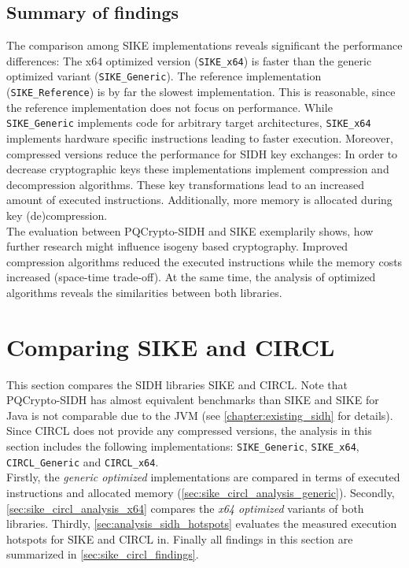 \subsection{Summary of findings}\label{sec:findings_sike}
The comparison among \gls{SIKE} implementations reveals significant the performance differences: The x64 optimized version (\texttt{SIKE\_x64}) is faster than the generic optimized variant (\texttt{SIKE\_Generic}). The reference implementation (\texttt{SIKE\_Reference}) is by far the slowest implementation. This is reasonable, since the reference implementation does not focus on performance. While \texttt{SIKE\_Generic} implements code for arbitrary target architectures, \texttt{SIKE\_x64} implements hardware specific instructions leading to faster execution.  Moreover, compressed versions reduce the performance for \gls{SIDH} key exchanges: In order to decrease cryptographic keys these implementations implement compression and decompression algorithms. These key transformations lead to an increased amount of executed instructions. Additionally, more memory is allocated during key (de)compression.\\
The evaluation between \gls{PQCrypto-SIDH} and \gls{SIKE} exemplarily shows, how further research might influence isogeny based cryptography. Improved compression algorithms reduced the executed instructions while the memory costs increased (space-time trade-off). At the same time, the analysis of optimized algorithms reveals the similarities between both libraries.

\newpage
\section{Comparing \gls{SIKE} and \gls{CIRCL}} \label{sec:sike_vs_circl}

This section compares the SIDH libraries \gls{SIKE} and \gls{CIRCL}. Note that \gls{PQCrypto-SIDH} has almost equivalent benchmarks than \gls{SIKE} and SIKE for Java is not comparable due to the JVM (see \autoref{chapter:existing_sidh}  for details). Since \gls{CIRCL} does not provide any compressed versions, the analysis in this section includes the following implementations: \texttt{SIKE\_Generic}, \texttt{SIKE\_x64}, \texttt{CIRCL\_Generic} and \texttt{CIRCL\_x64}.\\
Firstly, the \textit{generic optimized} implementations are compared in terms of executed instructions and allocated memory (\autoref{sec:sike_circl_analysis_generic}). Secondly, \autoref{sec:sike_circl_analysis_x64} compares the \textit{x64 optimized} variants of both libraries. Thirdly,  \autoref{sec:analysis_sidh_hotspots} evaluates the measured execution hotspots for \gls{SIKE} and \gls{CIRCL} in. Finally all findings in this section are summarized in \autoref{sec:sike_circl_findings}. 

